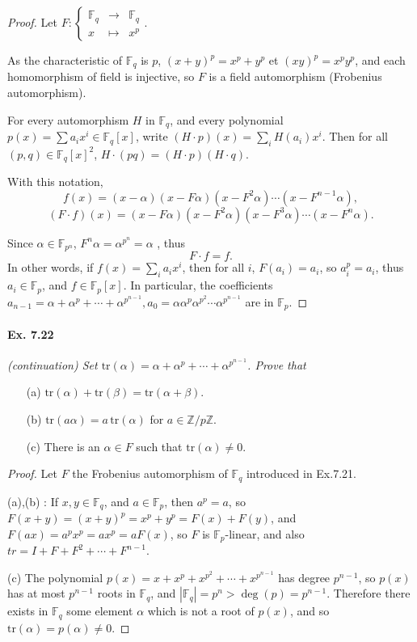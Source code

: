 \documentclass[11pt,a4paper]{article}
\newcommand{\Z}{\mathbb{Z}}
\newcommand{\F}{\mathbb{F}}
\begin{document}
\begin{proof}
Let 
$F : 
\left\{
\begin{array}{ccc}
 \mathbb{F}_q &  \to  &  \mathbb{F}_q \\
 x & \mapsto     &  x^p    
\end{array}
\right. .
$


As the characteristic of $\F_q$ is $p$, $(x+y)^p=x^p+y^p$ et $(xy)^p = x^py^p$, and each homomorphism of field is injective, so $F$ is a field automorphism (Frobenius automorphism).

For every automorphism $H$ in $\F_q$, and every polynomial $p(x) =\sum a_ix^i \in \F_q[x]$, write $(H\cdot p)(x) = \sum_i H(a_i) x^i$. Then for all $(p,q) \in \F_q[x]^2$, $H\cdot (pq) = (H\cdot p)(H\cdot q)$.

With this notation,
$$f(x) =(x-\alpha)(x-F\alpha)(x- F^2\alpha)\cdots (x-F^{n-1}\alpha),$$
$$(F\cdot f)(x) =(x-F\alpha)(x-F^2\alpha)(x- F^3\alpha)\cdots (x-F^{n}\alpha).$$

Since $\alpha \in \mathbb{F}_{p^n}$, $F^n\alpha = \alpha^{p^n} = \alpha$ , thus
$$F\cdot f = f.$$
In other words, if $f(x) =\sum_i a_i x^i$, then for all $i$, $F(a_i) = a_i$, so $a_i^p = a_i$, thus $a_i \in \F_p$, and $f \in \F_p[x]$.
In particular, the coefficients $a_{n-1}= \alpha + \alpha^p+\cdots+\alpha^{p^{n-1}}, a_0=\alpha\alpha^p\alpha^{p^2}\cdots\alpha^{p^{n-1}}$ are in $\F_p$.
\end{proof}

\paragraph{Ex. 7.22}

{\it (continuation) Set $\mathrm{tr}(\alpha) = \alpha+\alpha^p+\cdots+\alpha^{p^{n-1}}$. Prove that
\begin{enumerate}
\item[(a)] $\mathrm{tr}(\alpha) + \mathrm{tr}(\beta) = \mathrm{tr}(\alpha+\beta)$.
\item[(b)] $\mathrm{tr}(a\alpha) = a\, \mathrm{tr}(\alpha)$ for $a \in \Z/p\Z$.
\item[(c)] There is an $\alpha \in F$ such that $\mathrm{tr}(\alpha) \ne 0$.
\end{enumerate}
}

\begin{proof}
Let $F$ the Frobenius automorphism of $\F_q$ introduced in Ex.7.21.

(a),(b) : If $x,y \in \F_q$, and $a \in \F_p$, then $a^p = a$, so $F(x+y) =(x+y)^p = x^p+y^p = F(x)+F(y)$, and $F(ax) = a^p x^p = a x^p =a F(x)$, so $F$ is $\F_p$-linear, and also $tr = I + F + F^2+\cdots+F^{n-1}$. 

(c) The polynomial $p(x) = x+x^p+x^{p^2}+\cdots+x^{p^{n-1}}$ has degree $p^{n-1}$, so $p(x)$ has at most $p^{n-1}$ roots in $\F_q$, and $|\F_q| =p^n >\deg(p) = p^{n-1}$. Therefore there exists in $\F_q$ some element $\alpha$ which is not a root of $p(x)$, and so  $\mathrm{tr}(\alpha) = p(\alpha) \ne 0$.
\end{proof}
\end{document}
